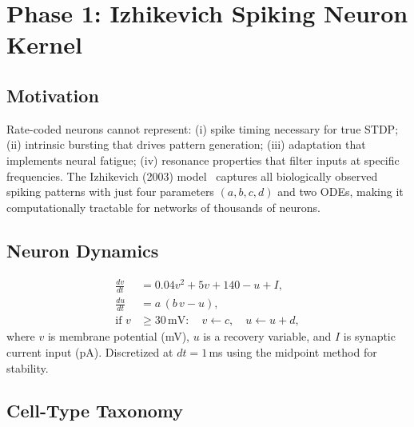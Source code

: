 \documentclass[11pt,a4paper]{article}
\begin{document}
\section{Phase 1: Izhikevich Spiking Neuron Kernel}\label{sec:phase1}

\subsection{Motivation}

Rate-coded neurons cannot represent:
(i) spike timing necessary for true STDP;
(ii) intrinsic bursting that drives pattern generation;
(iii) adaptation that implements neural fatigue;
(iv) resonance properties that filter inputs at specific frequencies.
The Izhikevich (2003) model~\cite{izhikevich2003} captures all biologically
observed spiking patterns with just four parameters $(a, b, c, d)$ and
two ODEs, making it computationally tractable for networks of thousands of neurons.

\subsection{Neuron Dynamics}

\begin{equation}\label{eq:izhi}
\boxed{
\begin{aligned}
  \frac{dv}{dt} &= 0.04v^2 + 5v + 140 - u + I, \\
  \frac{du}{dt} &= a\,(b\,v - u), \\
  \text{if } v &\geq 30\,\text{mV}: \quad v \leftarrow c,\quad u \leftarrow u + d,
\end{aligned}
}
\end{equation}
where $v$ is membrane potential (mV), $u$ is a recovery variable,
and $I$ is synaptic current input (pA).
Discretized at $dt = 1$\,ms using the midpoint method for stability.

\subsection{Cell-Type Taxonomy}
\end{document}

